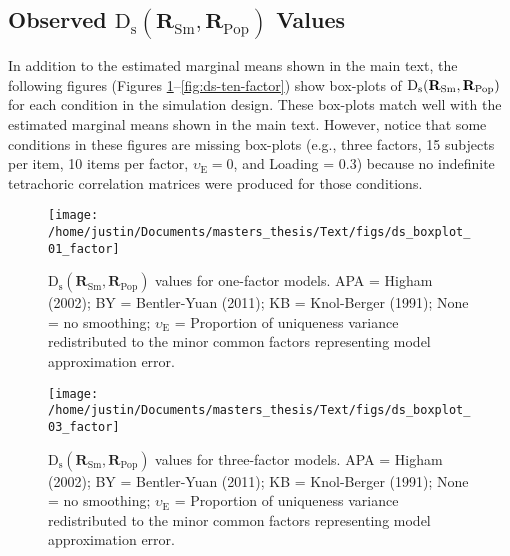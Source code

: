 \documentclass[
  english,
  man]{apa6}
\begin{document}
\begin{appendix}
\pagebreak

\hypertarget{observed-textrmd_textrmsmathbfr_textrmsm-mathbfr_textrmpop-values}{%
\subsection{\texorpdfstring{Observed
\(\textrm{D}_{\textrm{s}}(\mathbf{R}_{\textrm{Sm}}, \mathbf{R}_{\textrm{Pop}})\)
Values}{Observed \textbackslash textrm\{D\}\_\{\textbackslash textrm\{s\}\}(\textbackslash mathbf\{R\}\_\{\textbackslash textrm\{Sm\}\}, \textbackslash mathbf\{R\}\_\{\textbackslash textrm\{Pop\}\}) Values}}\label{observed-textrmd_textrmsmathbfr_textrmsm-mathbfr_textrmpop-values}}

In addition to the estimated marginal means shown in the main text, the
following figures (Figures
\ref{fig:ds-one-factor}--\ref{fig:ds-ten-factor}) show box-plots of
\(\mathrm{D}_{\mathrm{s}}(\mathbf{R}_{\textrm{Sm}}, \mathbf{R}_{\textrm{Pop}})\) for each condition in the simulation design. These box-plots
match well with the estimated marginal means shown in the main text.
However, notice that some conditions in these figures are missing
box-plots (e.g., three factors, 15 subjects per item, 10 items per
factor, \(\upsilon_\textrm{E} = 0\), and Loading = 0.3) because no
indefinite tetrachoric correlation matrices were produced for those
conditions.

\begin{figure}

{\centering \texttt{[image: /home/justin/Documents/masters\_thesis/Text/figs/ds\_boxplot\_01\_factor]} 

}

\caption{$\textrm{D}_{\textrm{s}}(\mathbf{R}_{\textrm{Sm}}, \mathbf{R}_{\textrm{Pop}})$ values for one-factor models. APA = Higham (2002); BY = Bentler-Yuan (2011); KB = Knol-Berger (1991); None = no smoothing; $\upsilon_{\textrm{E}}$ = Proportion of uniqueness variance redistributed to the minor common factors representing model approximation error.}\label{fig:ds-one-factor}
\end{figure}

\begin{figure}

{\centering \texttt{[image: /home/justin/Documents/masters\_thesis/Text/figs/ds\_boxplot\_03\_factor]} 

}

\caption{$\textrm{D}_{\textrm{s}}(\mathbf{R}_{\textrm{Sm}}, \mathbf{R}_{\textrm{Pop}})$ values for three-factor models. APA = Higham (2002); BY = Bentler-Yuan (2011); KB = Knol-Berger (1991); None = no smoothing; $\upsilon_{\textrm{E}}$ = Proportion of uniqueness variance redistributed to the minor common factors representing model approximation error.}\label{fig:ds-three-factor}
\end{figure}


\end{appendix}
\end{document}
